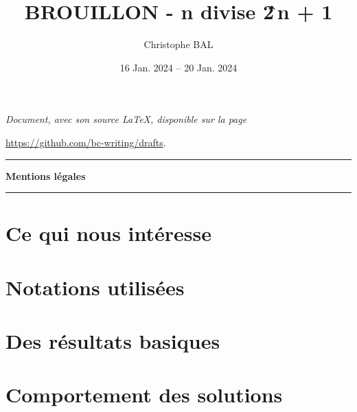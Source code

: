 \documentclass[12pt]{amsart}
\newcommand\contentdir{\jobname}
\begin{document}
\title{BROUILLON - n divise 2\^\,\!n + 1}
\author{Christophe BAL}
\date{16 Jan. 2024 -- 20 Jan. 2024}

\maketitle

\begin{center}
	\itshape
	Document, avec son source \LaTeX, disponible sur la page
	
	\url{https://github.com/bc-writing/drafts}.
\end{center}


\bigskip


\begin{center}
	\hrule\vspace{.3em}
	{
		\fontsize{1.35em}{1em}\selectfont
		\textbf{Mentions \og légales \fg}
	}
			
	\vspace{0.45em}
	\doclicenseThis
	\hrule
\end{center}


\setcounter{tocdepth}{2}
\tableofcontents


\newpage
\section{Ce qui nous intéresse}





\section{Notations utilisées}




\section{Des résultats basiques}



%
%
%


\section{Comportement des solutions}
\end{document}
